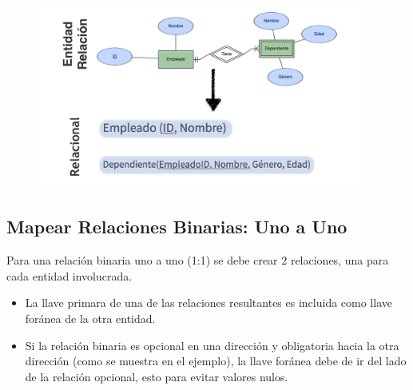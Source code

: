\documentclass[12pt, fleqn]{report}                             %
\begin{document}
                \begin{figure}[h]
                    \centering
                    \includegraphics[width=0.95\textwidth]{MapeoEntidadDebil}
                \end{figure}



            \clearpage
            \subsection{Mapear Relaciones Binarias: Uno a Uno}

                Para una relación binaria uno a uno (1:1) se debe crear 2 relaciones, una para cada entidad
                involucrada.

                \begin{itemize}
                    \item 
                        La llave primara de una de las relaciones resultantes es incluida como llave
                        foránea de la otra entidad.
                    \item
                        Si la relación binaria es opcional en una dirección y obligatoria hacia la otra dirección
                        (como se muestra en el ejemplo), la llave foránea debe de ir del lado de la relación
                        opcional, esto para evitar valores nulos.
                \end{itemize}
\end{document}
